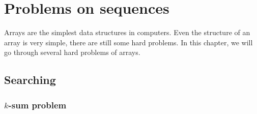\chapter{Problems on sequences}
Arrays are the simplest data structures in computers. Even the structure of an array is very simple, there are still some hard problems. In this chapter, we will go through several hard problems of arrays.

\section{Searching}

\subsection{$k$-sum problem}


